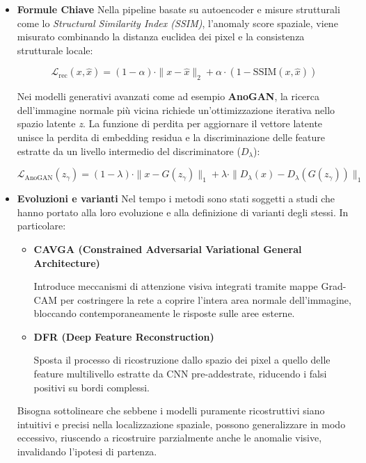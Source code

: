 \begin{itemize}
    \item \textbf{Formule Chiave}
    Nella pipeline basate su autoencoder e misure strutturali come lo \textit{Structural Similarity Index (SSIM)}, l'anomaly score spaziale, viene misurato combinando la distanza euclidea dei pixel e la consistenza strutturale locale:\cite{Lian_et_al._2023}\cite{Yang_et_al._2021}

    $$\mathcal{L}_{\text{rec}}(x, \hat{x}) = (1 - \alpha) \cdot \| x - \hat{x} \|_{2} + \alpha \cdot (1 - \text{SSIM}(x, \hat{x}))$$

    Nei modelli generativi avanzati come ad esempio \textbf{AnoGAN}, la ricerca dell'immagine normale più vicina richiede un'ottimizzazione iterativa nello spazio latente \textit{z}. 
    La funzione di perdita per aggiornare il vettore latente unisce la perdita di embedding residua e la discriminazione delle feature estratte da un livello intermedio del discriminatore ($D_\lambda$):\cite{Yang_et_al._2021}

    $$\mathcal{L}_{\text{AnoGAN}}(z_{\gamma}) = (1 - \lambda) \cdot \| x - G(z_{\gamma}) \|_{1} + \lambda \cdot \| D_{\lambda}(x) - D_{\lambda}(G(z_{\gamma})) \|_{1}$$

    \item\textbf{Evoluzioni e varianti}
    Nel tempo i metodi sono stati soggetti a studi che hanno portato alla loro evoluzione e alla definizione di varianti degli stessi. In particolare:

    \begin{itemize}
        \item \textbf{CAVGA (Constrained Adversarial Variational General Architecture)}

         Introduce meccanismi di attenzione visiva integrati tramite mappe Grad-CAM per costringere la rete a coprire l'intera area normale dell'immagine, bloccando contemporaneamente le risposte sulle aree esterne.

        \item \textbf{DFR (Deep Feature Reconstruction)}

        Sposta il processo di ricostruzione dallo spazio dei pixel a quello delle feature multilivello estratte da CNN pre-addestrate, riducendo i falsi positivi su bordi complessi.
    \end{itemize}

    Bisogna sottolineare che sebbene i modelli puramente ricostruttivi siano intuitivi e precisi nella localizzazione spaziale, possono generalizzare in modo eccessivo, riuscendo a ricostruire parzialmente anche le anomalie visive, invalidando l'ipotesi di partenza.\cite{Cui_et_al._2023}

\end{itemize}



